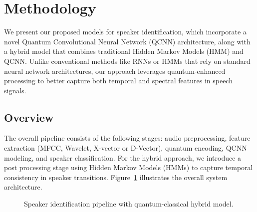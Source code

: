 \documentclass[conference]{IEEEtran}
\begin{document}
\section{Methodology}

We present our proposed models for speaker identification, which incorporate a novel Quantum Convolutional Neural Network (QCNN) architecture, along with a hybrid model that combines traditional Hidden Markov Models (HMM) and QCNN. Unlike conventional methods like RNNs or HMMs that rely on standard neural network architectures, our approach leverages quantum-enhanced processing to better capture both temporal and spectral features in speech signals.

\subsection{Overview}

The overall pipeline consists of the following stages: audio preprocessing, feature extraction (MFCC, Wavelet, X-vector or D-Vector), quantum encoding, QCNN modeling, and speaker classification. For the hybrid approach, we introduce a post processing stage using Hidden Markov Models (HMMs) to capture temporal consistency in speaker transitions. Figure~\ref{fig:pipeline} illustrates the overall system architecture.
\begin{figure}[ht]
    \centering
    \caption{Speaker identification pipeline with quantum-classical hybrid model.}
    \label{fig:pipeline}
\end{figure}
\end{document}
